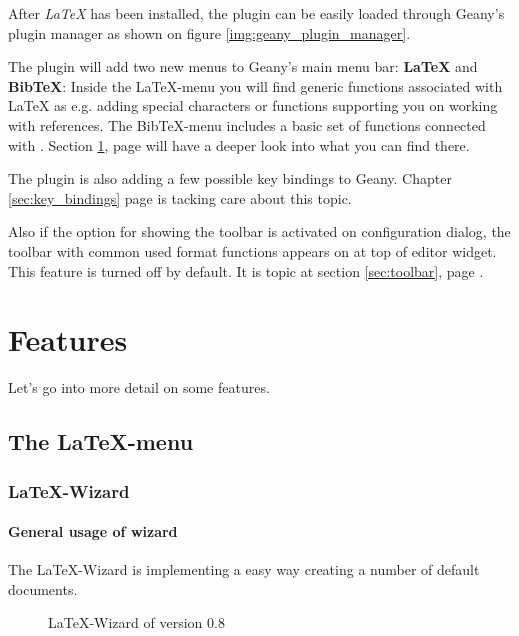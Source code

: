 \documentclass[%
paper=a4,%
fontsize=11pt,%
twoside=false,%
DIV18,%
headsepline,%
plainheadsepline,%
footsepline,%
plainfootsepline,%
bibliography=totoc,%
listof=totoc,%
BCOR10mm,%
parskip=half,%
openany,%
]{scrreprt}
\begin{document}
After \textit{LaTeX} has been installed, the plugin can be easily loaded
through Geany's plugin manager as shown on figure \ref{img:geany_plugin_manager}.

The plugin will add two new menus to Geany's main menu bar:
\textbf{LaTeX} and \textbf{BibTeX}: Inside the LaTeX-menu you will find
generic functions associated with \LaTeX{} as e.g. adding special
characters or functions supporting you on working with references. The
BibTeX-menu includes a basic set of functions connected with .
Section \ref{sec:features}, page \pageref{sec:features} will have a
deeper look into what you can find there.

The plugin is also adding a few possible key bindings to Geany. Chapter
\ref{sec:key_bindings} page \pageref{sec:key_bindings} is tacking care
about this topic.

Also if the option for showing the toolbar is activated on
configuration dialog, the toolbar with common used format functions
appears on at top of editor widget. This feature is turned off by
default. It is topic at section \ref{sec:toolbar}, page
\pageref{sec:toolbar}.


\chapter{Features}
\label{sec:features}
Let's go into more detail on some features.

\section{The \LaTeX{}-menu}
\subsection{\LaTeX-Wizard}

\subsubsection{General usage of wizard}

The \LaTeX-Wizard is implementing a easy way creating a number of
default documents.

\begin{figure}[h!]
    \caption{\LaTeX-Wizard of version 0.8}
\end{figure}
\end{document}
